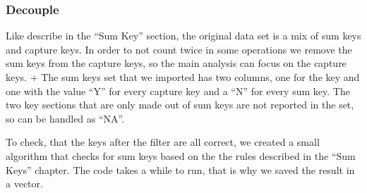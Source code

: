 \documentclass[
]{article}
\newenvironment{Shaded}{\begin{snugshade}}{\end{snugshade}}
\newcommand{\CommentTok}[1]{\textcolor[rgb]{0.56,0.35,0.01}{\textit{#1}}}
\newcommand{\KeywordTok}[1]{\textcolor[rgb]{0.13,0.29,0.53}{\textbf{#1}}}
\newcommand{\NormalTok}[1]{#1}
\newcommand{\OperatorTok}[1]{\textcolor[rgb]{0.81,0.36,0.00}{\textbf{#1}}}
\newcommand{\StringTok}[1]{\textcolor[rgb]{0.31,0.60,0.02}{#1}}
\begin{document}
\hypertarget{decouple}{%
\subsubsection{Decouple}\label{decouple}}

Like describe in the ``Sum Key'' section, the original data set is a mix
of sum keys and capture keys. In order to not count twice in some
operations we remove the sum keys from the capture keys, so the main
analysis can focus on the capture keys. + The sum keys set that we
imported has two columns, one for the key and one with the value ``Y''
for every capture key and a ``N'' for every sum key. The two key
sections that are only made out of sum keys are not reported in the set,
so can be handled as ``NA''.

\begin{Shaded}
\end{Shaded}

To check, that the keys after the filter are all correct, we created a
small algorithm that checks for sum keys based on the the rules
described in the ``Sum Keys'' chapter. The code takes a while to run,
that is why we saved the result in a vector.

\begin{Shaded}
\end{Shaded}
\end{document}
